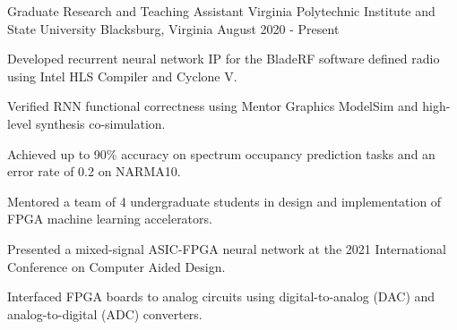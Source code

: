 


\begin{cventries}



\cventry
{Graduate Research and Teaching Assistant} %
{Virginia Polytechnic Institute and State University} %
{Blacksburg, Virginia} %
{August 2020 - Present} %
{ %
\begin{cvitems}
\item {Developed recurrent neural network IP for the BladeRF software defined radio using Intel HLS Compiler and Cyclone V.}
\item {Verified RNN functional correctness using Mentor Graphics ModelSim and high-level synthesis co-simulation.}
\item {Achieved up to 90\% accuracy on spectrum occupancy prediction tasks and an error rate of 0.2 on NARMA10.}
\item{Mentored a team of 4 undergraduate students in design and implementation of FPGA machine learning accelerators.}
\item{Presented a mixed-signal ASIC-FPGA neural network at the 2021 International Conference on Computer Aided Design.}
\item{Interfaced FPGA boards to analog circuits using digital-to-analog (DAC) and analog-to-digital (ADC) converters.}
\end{cvitems}
}


\end{cventries}
